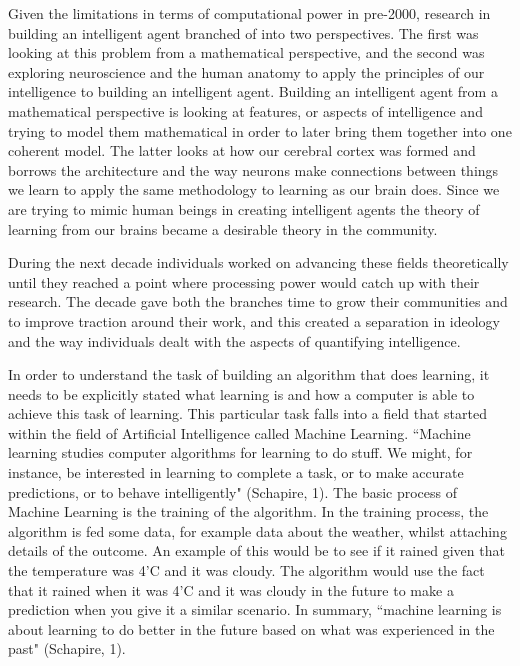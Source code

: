 \documentclass[11pt, oneside]{article}
\begin{document}
\par Given the limitations in terms of computational power in pre-2000, research in building an intelligent agent branched of into two perspectives. The first was looking at this problem from a mathematical perspective, and the second was exploring neuroscience and the human anatomy to apply the principles of our intelligence to building an intelligent agent. Building an intelligent agent from a mathematical perspective is looking at features, or aspects of intelligence and trying to model them mathematical in order to later bring them together into one coherent model. The latter looks at how our cerebral cortex was formed and borrows the architecture and the way neurons make connections between things we learn to apply the same methodology to learning as our brain does. Since we are trying to mimic human beings in creating intelligent agents the theory of learning from our brains became a desirable theory in the community. 

\par During the next decade individuals worked on advancing these fields theoretically until they reached a point where processing power would catch up with their research. The decade gave both the branches time to grow their communities and to improve traction around their work, and this created a separation in ideology and the way individuals dealt with the aspects of quantifying intelligence. 

\par In order to understand the task of building an algorithm that does learning, it needs to be explicitly stated what learning is and how a computer is able to achieve this task of learning. This particular task falls into a field that started within the field of Artificial Intelligence called Machine Learning. ``Machine learning studies computer algorithms for learning to do stuff. We might, for instance, be interested in learning to complete a task, or to make accurate predictions, or to behave intelligently" (Schapire, 1). The basic process of Machine Learning is the training of the algorithm. In the training process, the algorithm is fed some data, for example data about the weather, whilst attaching details of the outcome. An example of this would be to see if it rained given that the temperature was 4'C and it was cloudy. The algorithm would use the fact that it rained when it was 4'C and it was cloudy in the future to make a prediction when you give it a similar scenario. In summary, ``machine learning is about learning to do better in the future based on what was experienced in the past" (Schapire, 1).
\end{document}

